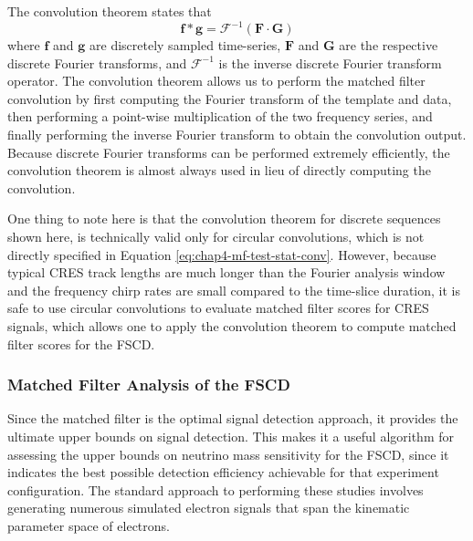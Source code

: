 The convolution theorem states that 
\begin{equation}
    \bm{f}\ast\bm{g} = \mathcal{F}^{-1}\left(\bm{F}\cdot \bm{G}\right)
    \label{eq:chap4-conv-theorem}
\end{equation}
where $\bm{f}$ and $\bm{g}$ are discretely sampled time-series, $\bm{F}$ and $\bm{G}$ are the respective discrete Fourier transforms, and $\mathcal{F}^{-1}$ is the inverse discrete Fourier transform operator. The convolution theorem allows us to perform the matched filter convolution by first computing the Fourier transform of the template and data, then performing a point-wise multiplication of the two frequency series, and finally performing the inverse Fourier transform to obtain the convolution output. Because discrete Fourier transforms can be performed extremely efficiently, the convolution theorem is almost always used in lieu of directly computing the convolution. 

One thing to note here is that the convolution theorem for discrete sequences shown here, is technically valid only for circular convolutions, which is not directly specified in Equation \ref{eq:chap4-mf-test-stat-conv}. However, because typical CRES track lengths are much longer than the Fourier analysis window and the frequency chirp rates are small compared to the time-slice duration, it is safe to use circular convolutions to evaluate matched filter scores for CRES signals, which allows one to apply the convolution theorem to compute matched filter scores for the FSCD.

\subsubsection*{Matched Filter Analysis of the FSCD}

Since the matched filter is the optimal signal detection approach, it provides the ultimate upper bounds on signal detection. This makes it a useful algorithm for assessing the upper bounds on neutrino mass sensitivity for the FSCD, since it indicates the best possible detection efficiency achievable for that experiment configuration. The standard approach to performing these studies involves generating numerous simulated electron signals that span the kinematic parameter space of electrons.%

